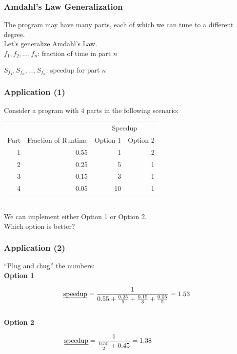\begin{frame}
  \frametitle{Amdahl's Law Generalization}

  \hspace*{2em} The program may have many parts, each of which we can tune to
  a different degree.\\[1em]

  Let's generalize Amdahl's Law.\\[1em]

  $f_1, f_2, \ldots, f_n$: fraction of time in part $n$

  $S_{f_1}, S_{f_n}, \ldots, S_{f_n}$: speedup for part $n$

  \vfill
  \begin{center}
  \structure{\[\mbox{\em speedup} = \frac{1}{\frac{f_1}{S_{f_1}} + \frac{f_2}{S_{f_2}} + \ldots +
    \frac{f_n}{S_{f_n}}}\]}
  \end{center}
\end{frame}


\begin{frame}
  \frametitle{Application (1)}

  \hspace*{2em} 
Consider a program with 4 parts in the following scenario:\\[2em]
    \begin{tabular}{r|r|r|r}
    \multicolumn{2}{l}{} & \multicolumn{2}{c}{Speedup} \\
    Part & Fraction of Runtime & Option 1 & Option 2\\
    \hline
    1 & 0.55 & 1  & 2\\
    2 & 0.25 & 5  & 1\\
    3 & 0.15 & 3  & 1\\
    4 & 0.05  & 10 & 1\\
  \end{tabular}

~\\[2em]
  We can implement either Option 1 or Option 2. \\
  Which option is better?

\end{frame}

\begin{frame}
  \frametitle{Application (2)}


  \hspace*{2em} ``Plug and chug'' the numbers:\\[1em]

  {\bf Option 1} \vspace*{-2em}

  \[ \mbox{\em speedup} = \frac{1}{0.55 + \frac{0.25}{5} + \frac{0.15}{3} + \frac{0.05}{5}}
    = 1.53  \]
~\\[1em]
  {\bf Option 2} \vspace*{-2em}

   \[\mbox{\em speedup} = \frac{1}{\frac{0.55}{2} + 0.45} = 1.38 \hspace*{5.5em}\]


\end{frame}

